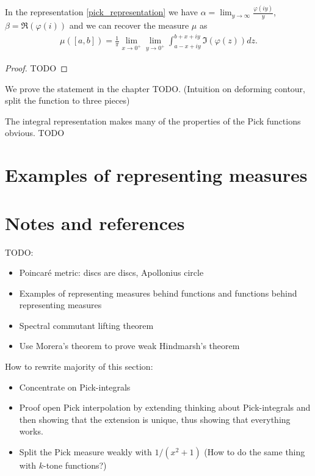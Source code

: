 \begin{lause}
	In the representation \ref{pick_representation} we have
	$\alpha = \lim_{y \to \infty} \frac{\varphi(i y)}{y}$, $\beta = \Re(\varphi(i))$ and we can recover the measure $\mu$ as
	\begin{align}\label{measure_recovery}
		\mu([a, b]) = \frac{1}{\pi}\lim_{x \to 0^{+}} \lim_{y \to 0^{+}} \int_{a - x + i y}^{b + x + i y} \Im(\varphi(z)) d z.
	\end{align}
\end{lause}

\begin{proof}
TODO
\end{proof}

We prove the statement in the chapter TODO. (Intuition on deforming contour, split the function to three pieces)

The integral representation makes many of the properties of the Pick functions obvious. TODO

\section{Examples of representing measures}

\section{Notes and references}

TODO:
\begin{itemize}
	\item Poincaré metric: discs are discs, Apollonius circle
	\item Examples of representing measures behind functions and functions behind representing measures
	\item Spectral commutant lifting theorem
	\item Use Morera's theorem to prove weak Hindmarsh's theorem
\end{itemize}


How to rewrite majority of this section:
\begin{itemize}
	\item Concentrate on Pick-integrals
	\item Proof open Pick interpolation by extending thinking about Pick-integrals and then showing that the extension is unique, thus showing that everything works.
	\item Split the Pick measure weakly with $1/(x^2 + 1)$ (How to do the same thing with $k$-tone functions?)
\end{itemize}

